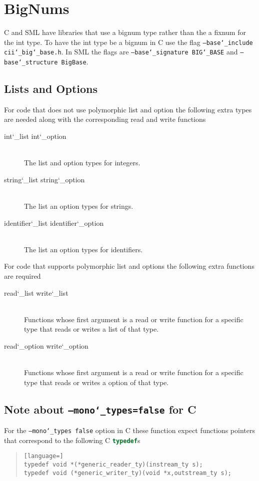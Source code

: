 \section{BigNums}
C and SML have libraries that use a bignum type
rather than the a fixnum for the \asdl{} int type. To have the int type
be a bignum in C use the flag \texttt{--base\char`\_include cii\char`\_big\char`\_base.h}. In
SML the flags are \texttt{--base\char`\_signature BIG\char`\_BASE} and
\texttt{--base\char`\_structure BigBase}.

\subsection{Lists and Options}
For code that does not use polymorphic list and option the following extra
types are needed along with the corresponding read and write functions
\begin{description}
  \item[int\char`\_list int\char`\_option] \mbox{}\\
    The list and option types for integers.
  \item[string\char`\_list string\char`\_option] \mbox{}\\
    The list an option types for strings.
  \item[identifier\char`\_list identifier\char`\_option] \mbox{}\\
    The list an option types for identifiers.
\end{description}%

For code that supports polymorphic list and options the following extra
functions are required

\begin{description}
  \item[read\char`\_list write\char`\_list] \mbox{}\\
    Functions whose first argument is a read or write
    function for a specific type that reads or writes a list of that type.
  \item[read\char`\_option write\char`\_option] \mbox{}\\
    Functions whose first argument is a read or write
    function for a specific type that reads or writes a option of that type.
\end{description}%

\subsection{Note about \texttt{--mono\char`\_types=false} for C}
For the \texttt{--mono\char`\_types false} option in C these function expect functions
pointers that correspond to the following C \lstinline[language=c]!typedef!s
\begin{quote}\begin{lstlisting}[language=]
typedef void *(*generic_reader_ty)(instream_ty s);
typedef void (*generic_writer_ty)(void *x,outstream_ty s);
\end{lstlisting}\end{quote}%

